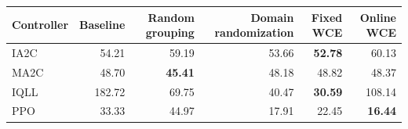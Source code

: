 \begin{tabular}{lrrrrr}
\hline
Controller & Baseline & Random grouping & Domain randomization & Fixed WCE & Online WCE \\
\hline
IA2C & 54.21 & 59.19 & 53.66 & \textbf{52.78} & 60.13 \\
MA2C & 48.70 & \textbf{45.41} & 48.18 & 48.82 & 48.37 \\
IQLL & 182.72 & 69.75 & 40.47 & \textbf{30.59} & 108.14 \\
PPO & 33.33 & 44.97 & 17.91 & 22.45 & \textbf{16.44} \\
\hline
\end{tabular}
